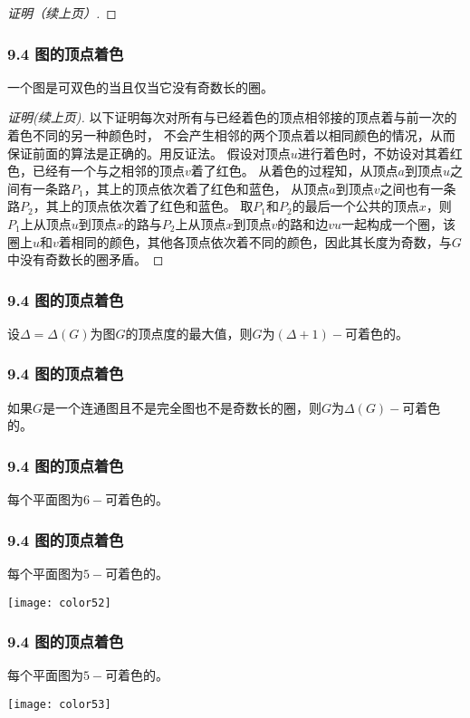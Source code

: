\documentclass{beamer}
\begin{document}
\begin{CJK}{UTF8}{gbsn}
\begin{frame}
\begin{proof}[证明（续上页）]
  \end{proof}
\end{frame}
\begin{frame}
  \frametitle{9.4 图的顶点着色}
  \begin{Thm2}
    一个图是可双色的当且仅当它没有奇数长的圈。
  \end{Thm2}
  \begin{proof}[证明(续上页)]
    以下证明每次对所有与已经着色的顶点相邻接的顶点着与前一次的着色不同的另一种颜色时，
不会产生相邻的两个顶点着以相同颜色的情况，从而保证前面的算法是正确的。用反证法。
假设对顶点$u$进行着色时，不妨设对其着红色，已经有一个与之相邻的顶点$v$着了红色。
从着色的过程知，从顶点$a$到顶点$u$之间有一条路$P_1$，其上的顶点依次着了红色和蓝色，
从顶点$a$到顶点$v$之间也有一条路$P_2$，其上的顶点依次着了红色和蓝色。
取$P_1$和$P_2$的最后一个公共的顶点$x$，则$P_1$上从顶点$u$到顶点$x$的路与$P_2$上从顶点$x$到顶点$v$的路和边$vu$一起构成一个圈，该圈上$u$和$v$着相同的颜色，其他各顶点依次着不同的颜色，因此其长度为奇数，与$G$中没有奇数长的圈矛盾。 
  \end{proof}
\end{frame}

\begin{frame}
  \frametitle{9.4 图的顶点着色}
  \begin{Thm}
    设$\Delta = \Delta (G)$为图$G$的顶点度的最大值，则$G$为$(\Delta+1)-$可着色的。
  \end{Thm}
\end{frame}
\begin{frame}
  \frametitle{9.4 图的顶点着色}
  \begin{Thm}
    如果$G$是一个连通图且不是完全图也不是奇数长的圈，则$G$为$\Delta(G)-$可着色的。
  \end{Thm}
\end{frame}
\begin{frame}
  \frametitle{9.4 图的顶点着色}
  \begin{Thm}
    每个平面图为$6-$可着色的。
  \end{Thm}
\end{frame}
\begin{frame}
  \frametitle{9.4 图的顶点着色}
  \begin{Thm}
    每个平面图为$5-$可着色的。
  \end{Thm}
\vspace{1cm}
\texttt{[image: color52]}
\end{frame}
\begin{frame}
  \frametitle{9.4 图的顶点着色}
  \begin{Thm3}
    每个平面图为$5-$可着色的。
  \end{Thm3}
\vspace{1cm}
\texttt{[image: color53]}
\end{frame}


\end{CJK}
\end{document}
